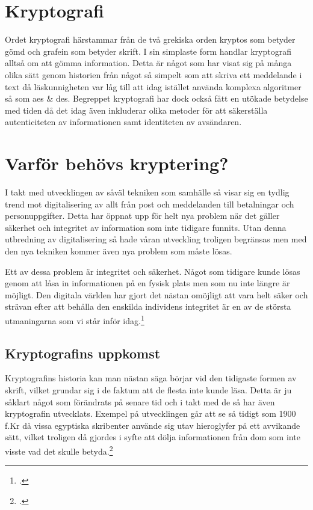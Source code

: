 
\section{Kryptografi} %
Ordet kryptografi härstammar från de två grekiska orden
kryptos som betyder gömd och grafein som betyder skrift.
I sin simplaste form handlar kryptografi alltså om att
gömma information. Detta är något som har visat sig på många
olika sätt genom historien från något så simpelt som att skriva
ett meddelande i text då läskunnigheten var låg till
att idag istället använda komplexa algoritmer så som \acrshort{aes} \& \acrshort{des}.
Begreppet kryptografi har dock också fått en utökade betydelse
med tiden då det idag även inkluderar olika metoder för att
säkerställa autenticiteten av informationen samt identiteten av avsändaren.

\section{Varför behövs kryptering?} %
\label{sec:varfor-behovs-kryptering}
I takt med utvecklingen av såväl tekniken som samhälle så visar sig en tydlig trend mot digitalisering av allt från
post och meddelanden till betalningar och personuppgifter. Detta har öppnat upp för helt
nya problem när det gäller säkerhet och integritet av information som inte tidigare funnits. Utan denna utbredning av
digitalisering så hade våran utveckling troligen begränsas men med den nya tekniken kommer även nya problem
som måste lösas.

Ett av dessa problem är integritet och säkerhet. Något som tidigare kunde lösas genom att låsa in informationen på
en fysisk plats men som nu inte längre är möjligt. Den digitala världen har gjort det nästan
omöjligt att vara helt säker och strävan efter att behålla den enskilda individens integritet
är en av de största utmaningarna som vi står inför idag.\footcite{diffie2010privacy}

\subsection{Kryptografins uppkomst} %
Kryptografins historia kan man nästan säga börjar vid den
tidigaste formen av skrift, vilket grundar sig i de faktum att
de flesta inte kunde läsa. Detta är ju såklart något som förändrats
på senare tid och i takt med de så har även kryptografin utvecklats.
Exempel på utvecklingen går att se så tidigt som 1900 f.Kr då vissa egyptiska
skribenter använde sig utav hieroglyfer på ett avvikande sätt, vilket
troligen då gjordes i syfte att dölja informationen från dom som inte
visste vad det skulle betyda.\footcite{kryptografi-historia-1}


